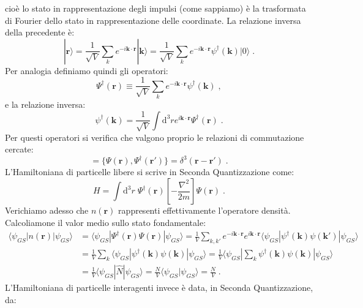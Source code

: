 \documentclass[10pt,a4paper]{report}
\theoremstyle{definition}
\numberwithin{equation}{section}
\newcommand{\diff}[1][]{\mathrm{d}#1}
\newcommand{\bra}{\langle}
\newcommand{\ket}{\rangle}
\begin{document}
cioè lo stato in rappresentazione degli impulsi (come sappiamo) è la trasformata di Fourier dello stato in rappresentazione delle coordinate. La relazione inversa della precedente è:
\begin{equation}
|\mathbf{r}\ket=\frac{1}{\sqrt{V}}\sum_k e^{-i\mathbf{k}\cdot\mathbf{r}}|\mathbf{k}\ket=\frac{1}{\sqrt{V}}\sum_k e^{-i\mathbf{k}\cdot\mathbf{r}}\psi^{\dagger}(\mathbf{k})|0\ket\;.
\end{equation}
Per analogia definiamo quindi gli operatori:
\begin{equation}
\Psi^{\dagger}(\mathbf{r})\equiv \frac{1}{\sqrt{V}}\sum_k e^{-i\mathbf{k}\cdot\mathbf{r}}\psi^{\dagger}(\mathbf{k})\;,
\end{equation}
e la relazione inversa:
\begin{equation}
\psi^{\dagger}(\mathbf{k})=\frac{1}{\sqrt{V}}\int\diff^3{r}e^{i\mathbf{k}\cdot\mathbf{r}}\Psi^{\dagger}(\mathbf{r})\;.
\end{equation}
Per questi operatori si verifica che valgono proprio le relazioni di commutazione cercate:
\begin{equation}
[\Psi(\mathbf{r}),\Psi^{\dagger}(\mathbf{r}')]=\{\Psi(\mathbf{r}),\Psi^{\dagger}(\mathbf{r}')\}=\delta^3(\mathbf{r}-\mathbf{r}')\;.
\end{equation}
L'Hamiltoniana di particelle libere si scrive in Seconda Quantizzazione come:
\begin{equation}
H=\int\diff^3{r}\; \Psi^{\dagger}(\mathbf{r})\left[-\frac{\nabla^2}{2m}\right]\Psi(\mathbf{r})\;.
\end{equation}
Verichiamo adesso che $n(\mathbf{r})$ rappresenti effettivamente l'operatore densità. Calcoliamone il valor medio sullo stato fondamentale:
\begin{align*}
\bra \psi_{GS}|n(\mathbf{r})|\psi_{GS}\ket &=\bra\psi_{GS}|\Psi^{\dagger}(\mathbf{r})\Psi(\mathbf{r})|\psi_{GS}\ket=
\frac{1}{V}\sum_{k,k'}e^{-i\mathbf{k}\cdot\mathbf{r}}e^{i\mathbf{k}\cdot\mathbf{r}}\bra\psi_{GS}|\psi^{\dagger}(\mathbf{k})\psi(\mathbf{k}')|\psi_{GS}\ket \\
&= \frac{1}{V}\sum_k\bra\psi_{GS}|\psi^{\dagger}(\mathbf{k})\psi(\mathbf{k})|\psi_{GS}\ket=\frac{1}{V}\bra\psi_{GS}|\sum_k \psi^{\dagger}(\mathbf{k})\psi(\mathbf{k})|\psi_{GS}\ket \\
&= \frac{1}{V}\bra \psi_{GS}|\hat{N}|\psi_{GS}\ket=\frac{N}{V}\bra\psi_{GS}|\psi_{GS}\ket=\frac{N}{V}\;.
\end{align*}
L'Hamiltoniana di particelle interagenti invece è data, in Seconda Quantizzazione, da:
\end{document}

